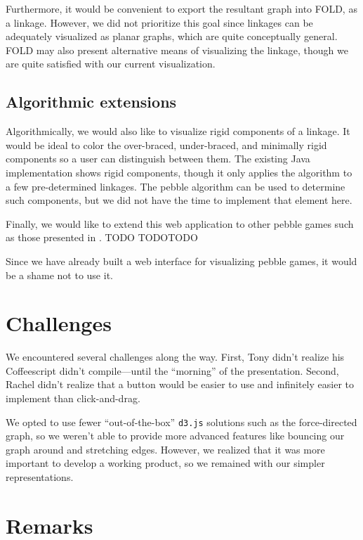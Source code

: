 \documentclass[aps,prd,final,twocolumn,letterpaper,nofootinbib]{revtex4-1}
\begin{document}
Furthermore, it would be convenient to export the resultant graph into FOLD,
as a linkage. However, we did not prioritize this goal since
linkages can be adequately visualized as planar graphs,
which are quite conceptually general.
FOLD may also present alternative means of visualizing the linkage,
though we are quite satisfied with our current visualization.

\subsection{Algorithmic extensions}

Algorithmically, we would also like to visualize rigid components of a linkage.
It would be ideal to color the over-braced,
under-braced, and minimally rigid components so a user
can distinguish between them.
The existing Java implementation shows rigid components,
though it only applies the algorithm to a few pre-determined linkages.
The pebble algorithm can be used to determine such components,
but we did not have the time to implement that element here.

Finally, we would like to extend this web application to other pebble games
such as those presented in \cite{lee08, chubynsky07}.
TODO TODOTODO

Since we have already built a web interface for visualizing pebble games,
it would be a shame not to use it.

\section*{Challenges}

We encountered several challenges along the way.
First, Tony didn't realize his Coffeescript didn't compile---until the ``morning''
of the presentation.
Second, Rachel didn't realize that a button would be easier to use
and infinitely easier to implement than click-and-drag.

We opted to use fewer ``out-of-the-box'' \texttt{d3.js} solutions such as
the force-directed graph, so we weren't able to provide more advanced features
like bouncing our graph around and stretching edges.
However, we realized that it was more important to develop a working product,
so we remained with our simpler representations.

\section*{Remarks}
\end{document}
